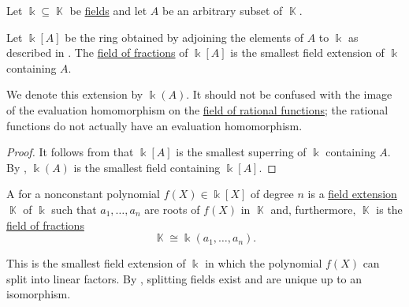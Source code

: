 \begin{proposition}\label{thm:adjoining_elements_to_field}
  Let \( \Bbbk \subseteq \BbbK \) be \hyperref[def:field]{fields} and let \( A \) be an arbitrary subset of \( \BbbK \).

  Let \( \Bbbk[A] \) be the ring obtained by adjoining the elements of \( A \) to \( \Bbbk \) as described in . The \hyperref[def:field_of_fractions]{field of fractions} of \( \Bbbk[A] \) is the smallest field extension of \( \Bbbk \) containing \( A \).

  We denote this extension by \( \Bbbk(A) \). It should not be confused with the image of the evaluation homomorphism on the \hyperref[def:rational_function_field]{field of rational functions}; the rational functions do not actually have an evaluation homomorphism.
\end{proposition}
\begin{proof}
  It follows from  that \( \Bbbk[A] \) is the smallest superring of \( \Bbbk \) containing \( A \). By , \( \Bbbk(A) \) is the smallest field containing \( \Bbbk[A] \).
\end{proof}

\begin{definition}\label{def:splitting_field}
  A  for a nonconstant polynomial \( f(X) \in \Bbbk[X] \) of degree \( n \) is a \hyperref[def:field_extension]{field extension} \( \BbbK \) of \( \Bbbk \) such that \( a_1, \ldots, a_n \) are roots of \( f(X) \) in \( \BbbK \) and, furthermore, \( \BbbK \) is the \hyperref[thm:field_of_fractions]{field of fractions}
  \begin{equation*}
    \BbbK \cong \Bbbk(a_1, \ldots, a_n).
  \end{equation*}

  This is the smallest field extension of \( \Bbbk \) in which the polynomial \( f(X) \) can split into linear factors. By , splitting fields exist and are unique up to an isomorphism.
\end{definition}

